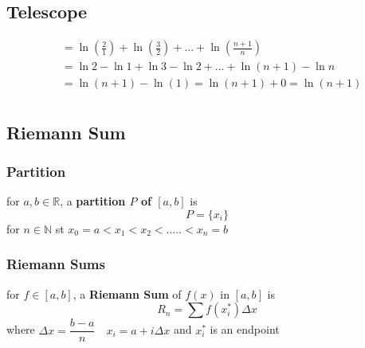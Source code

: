 		\subsection{Telescope}
			\begin{example}[$\displaystyle\sum\ln\left(\frac{i+1}i\right)=ln(n+1)$]
				\begin{align*}
					&=\ln\left(\frac21\right)+\ln\left(\frac32\right)+...+\ln\left(\frac{n+1}n\right)\tag*{(def of $\Sigma$)}\\
					&=\ln2-\ln1+\ln3-\ln2+...+\ln(n+1)-\ln n\tag*{($\ln$ law)}\\
					&=\ln(n+1)-\ln(1)=\ln(n+1)+0=\ln(n+1)\\
				\end{align*}
			\end{example}

	\subsection{Riemann Sum}
		\subsubsection{Partition}
			\begin{definition}
				for $a,b\in\mathbb{R}$, a \textbf{partition $P$ of $[a,b]$} is
				$$P=\{x_i\}$$
				for $n\in\mathbb{N}$ st $x_0=a<x_1<x_2<.....<x_n=b$
			\end{definition}
		\subsubsection{Riemann Sums}
			\begin{definition}
				for $f\in[a,b]$, a \textbf{Riemann Sum} of $f(x)$ in $[a,b]$ is
				$$R_n=\sum f(x^*_i)\Delta x$$
				where $\Delta x=\dfrac{b-a}n\quad x_i=a+i\Delta x$ and $x_i^*$ is an endpoint
			\end{definition}
